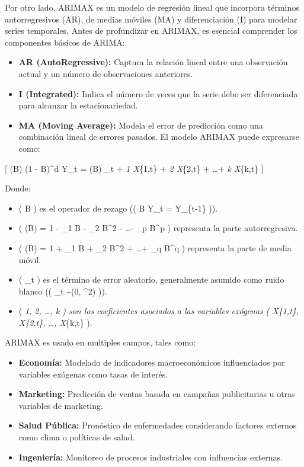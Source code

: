 Por otro lado, ARIMAX es un modelo de regresión lineal que incorpora
términos autorregresivos (AR), de medias móviles (MA) y diferenciación
(I) para modelar series temporales. Antes de profundizar en ARIMAX, es
esencial comprender los componentes básicos de ARIMA:

\begin{itemize}
\tightlist
\item
  \textbf{AR (AutoRegressive):} Captura la relación lineal entre una
  observación actual y un número de observaciones anteriores.
\item
  \textbf{I (Integrated):} Indica el número de veces que la serie debe
  ser diferenciada para alcanzar la estacionariedad.
\item
  \textbf{MA (Moving Average):} Modela el error de predicción como una
  combinación lineal de errores pasados. El modelo ARIMAX puede
  expresarse como:
\end{itemize}

{[} \Phi(B) (1 - B)\^{}d Y\_t = \Theta(B) \epsilon\_t + \beta\emph{1
X}\{1,t\} + \beta\emph{2 X}\{2,t\} + \dots + \beta\emph{k X}\{k,t\} {]}

Donde:

\begin{itemize}
\tightlist
\item
  ( B ) es el operador de rezago (( B Y\_t = Y\_\{t-1\} )).
\item
  ( \Phi(B) = 1 - \phi\_1 B - \phi\_2 B\^{}2 - \dots - \phi\_p B\^{}p )
  representa la parte autorregresiva.
\item
  ( \Theta(B) = 1 + \theta\_1 B + \theta\_2 B\^{}2 + \dots + \theta\_q
  B\^{}q ) representa la parte de media móvil.
\item
  ( \epsilon\_t ) es el término de error aleatorio, generalmente asumido
  como ruido blanco (( \epsilon\_t \sim {}(0, \sigma\^{}2) )).
\item
  ( \beta\emph{1, \beta\emph{2, \dots, \beta\emph{k ) son los
  coeficientes asociados a las variables exógenas ( X}\{1,t\},
  X}\{2,t\}, \dots, X}\{k,t\} ).
\end{itemize}

ARIMAX es usado en multiples campos, tales como:

\begin{itemize}
\tightlist
\item
  \textbf{Economía:} Modelado de indicadores macroeconómicos
  influenciados por variables exógenas como tasas de interés.
\item
  \textbf{Marketing:} Predicción de ventas basada en campañas
  publicitarias u otras variables de marketing.
\item
  \textbf{Salud Pública:} Pronóstico de enfermedades considerando
  factores externos como clima o políticas de salud.
\item
  \textbf{Ingeniería:} Monitoreo de procesos industriales con
  influencias externas.
\end{itemize}

